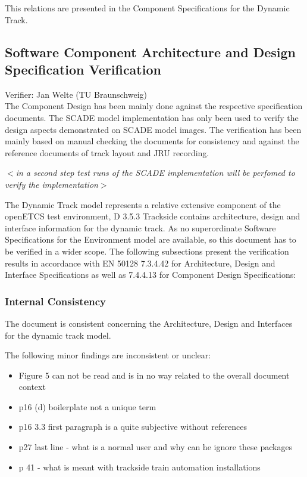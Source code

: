 \documentclass{article}
\newcommand{\tbi}[1]{$<$\textit{#1}$>$}
\begin{document}
This relations are presented in the Component Specifications for the Dynamic Track.

\subsection{Software Component Architecture and Design Specification Verification}

Verifier: Jan Welte (TU Braunschweig)\\

The Component Design has been mainly done against the respective specification documents. The SCADE model implementation has only been used to verify the design aspects demonstrated on SCADE model images.
The verification has been mainly based on manual checking the documents for consistency and against the reference documents of track layout and JRU recording.

\tbi{in a second step test runs of the SCADE implementation will be perfomed to verify the implementation}

The Dynamic Track model represents a relative extensive component of the openETCS test environment,  D 3.5.3 Trackside contains architecture, design and interface information for the dynamic track. As no superordinate Software Specifications for the Environment model are available, so this document has to be verified in a wider scope.
The following subsections present the verification results in accordance with EN 50128 7.3.4.42 for Architecture, Design and Interface Specifications as well as 7.4.4.13 for Component Design Specifications:

\subsubsection{Internal Consistency}

The document is consistent concerning the Architecture, Design and Interfaces for the dynamic track model. 

The following minor findings are inconsistent or unclear:
\begin{itemize}
\item Figure 5 can not be read and is in no way related to the overall document context
\item p16 (d) boilerplate not a unique term
\item p16 3.3 first paragraph is a quite subjective without references
\item p27 last line - what is a normal user and why can he ignore these packages
\item p 41 - what is meant with trackside train automation installations
\end{itemize}
\end{document}
